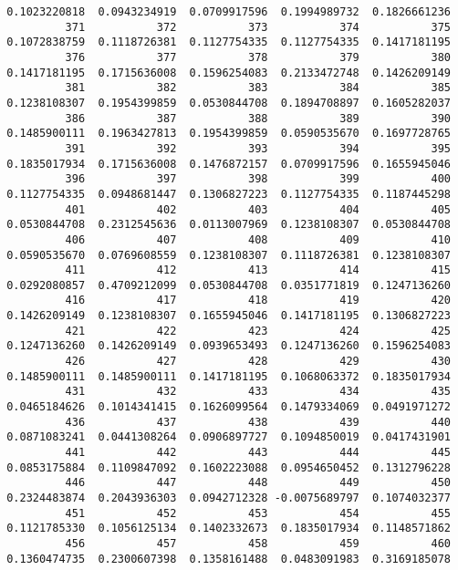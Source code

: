\documentclass[
  letterpaper,
  DIV=11,
  numbers=noendperiod]{scrreprt}
\begin{document}
\begin{verbatim}
 0.1023220818  0.0943234919  0.0709917596  0.1994989732  0.1826661236 
          371           372           373           374           375 
 0.1072838759  0.1118726381  0.1127754335  0.1127754335  0.1417181195 
          376           377           378           379           380 
 0.1417181195  0.1715636008  0.1596254083  0.2133472748  0.1426209149 
          381           382           383           384           385 
 0.1238108307  0.1954399859  0.0530844708  0.1894708897  0.1605282037 
          386           387           388           389           390 
 0.1485900111  0.1963427813  0.1954399859  0.0590535670  0.1697728765 
          391           392           393           394           395 
 0.1835017934  0.1715636008  0.1476872157  0.0709917596  0.1655945046 
          396           397           398           399           400 
 0.1127754335  0.0948681447  0.1306827223  0.1127754335  0.1187445298 
          401           402           403           404           405 
 0.0530844708  0.2312545636  0.0113007969  0.1238108307  0.0530844708 
          406           407           408           409           410 
 0.0590535670  0.0769608559  0.1238108307  0.1118726381  0.1238108307 
          411           412           413           414           415 
 0.0292080857  0.4709212099  0.0530844708  0.0351771819  0.1247136260 
          416           417           418           419           420 
 0.1426209149  0.1238108307  0.1655945046  0.1417181195  0.1306827223 
          421           422           423           424           425 
 0.1247136260  0.1426209149  0.0939653493  0.1247136260  0.1596254083 
          426           427           428           429           430 
 0.1485900111  0.1485900111  0.1417181195  0.1068063372  0.1835017934 
          431           432           433           434           435 
 0.0465184626  0.1014341415  0.1626099564  0.1479334069  0.0491971272 
          436           437           438           439           440 
 0.0871083241  0.0441308264  0.0906897727  0.1094850019  0.0417431901 
          441           442           443           444           445 
 0.0853175884  0.1109847092  0.1602223088  0.0954650452  0.1312796228 
          446           447           448           449           450 
 0.2324483874  0.2043936303  0.0942712328 -0.0075689797  0.1074032377 
          451           452           453           454           455 
 0.1121785330  0.1056125134  0.1402332673  0.1835017934  0.1148571862 
          456           457           458           459           460 
 0.1360474735  0.2300607398  0.1358161488  0.0483091983  0.3169185078 

\end{verbatim}
\end{document}
